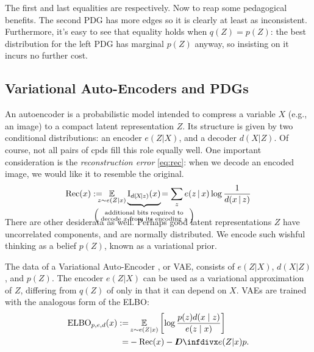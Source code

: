 The first and last equalities are  respectively.
Now to reap some pedagogical benefits.
The second PDG has more edges so it is clearly at least as inconsistent. Furthermore, it's easy to see that equality holds when $q(Z) \!=\! p(Z)$: the best distribution for the left PDG has marginal $p(Z)$ anyway, so insisting on it incurs no further cost.




\subsection{Variational Auto-Encoders and PDGs}

An autoencoder is a probabilistic model intended to compress a
variable $X$ (e.g., an image) to a compact latent representation
$Z$.
Its structure is given by two conditional distributions:
an encoder $e(Z | X)$, and a decoder $d(X | Z)$.
Of course, not all pairs of cpds fill this role equally well.
One important consideration is the
\emph{reconstruction error} \eqref{eq:rec}: when we decode an encoded image, we would like it to resemble the original.
\begin{equation}
	\mathrm{Rec}(x) := \!\!\!\!\! \Ex_{z \sim e(Z|x)} \smash{\underbrace{\mathrm I_{d(\!X\!|z)}(x)\vphantom{\Big|}}_{\mathclap{\left(\;\substack{\text{additional bits required to}\\\text{decode $x$ from its encoding  $z$}}\;\right)}}}
	\!= \sum_z e(z \,|\, x) \log \frac1{d(x \,|\, z)}\label{eq:rec}
\end{equation}


There are other desiderata as well. Perhaps good latent representations $Z$ have uncorrelated components, and are normally distributed.
We encode such wishful thinking as a belief $p(Z)$, known as a variational prior.

The data of a Variational Auto-Encoder
\parencite{kingma2013autoencoding,rezende2014stochastic}, or VAE,
consists of $e(Z|X)$, $d(X|Z)$, and $p(Z)$.
The encoder $e(Z|X)$ can be used as a variational approximation of $Z$, differing from $q(Z)$ of  only in that it can depend on $X$.
VAEs are trained with the analogous form of the ELBO:
\begin{align*}
	\mathrm{ELBO}_{p,e,d}(x) :=&
		\Ex_{z \sim e(Z|x)} \left[\log \frac{p(z) d(x\mid z)}{e(z\mid x)} \right] \\
		=& - \mathrm{Rec}(x) - \kldiv{e(Z|x)}{p}.
\end{align*}

